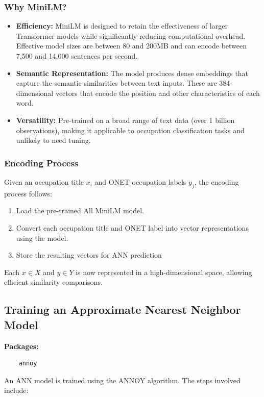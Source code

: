\documentclass[12pt]{article}
\begin{document}
\subsubsection{Why MiniLM?}
\begin{itemize}
    \item \textbf{Efficiency:} MiniLM is designed to retain the effectiveness of larger Transformer models while significantly reducing computational overhead. Effective model sizes are between 80 and 200MB and can encode between 7,500 and 14,000 sentences per second. 
    \item \textbf{Semantic Representation:} The model produces dense embeddings that capture the semantic similarities between text inputs. These are 384-dimensional vectors that encode the position and other characteristics of each word.
    \item \textbf{Versatility:} Pre-trained on a broad range of text data (over 1 billion observations), making it applicable to occupation classification tasks and unlikely to need tuning. 
\end{itemize}

\subsubsection{Encoding Process}
Given an occupation title \(x_i\) and ONET occupation labels \(y_j\), the encoding process follows:

\begin{enumerate}
    \item Load the pre-trained All MiniLM model.
    \item Convert each occupation title and ONET label into vector representations using the model.
    \item Store the resulting vectors for ANN prediction
\end{enumerate}

Each $x \in X$ and $y \in Y$ is now represented in a high-dimensional space, allowing efficient similarity comparisons.

\subsection{Training an Approximate Nearest Neighbor Model}

\textbf{Packages:}
\begin{verbatim}
    annoy
\end{verbatim}

An ANN model is trained using the ANNOY algorithm. The steps involved include:
\end{document}
